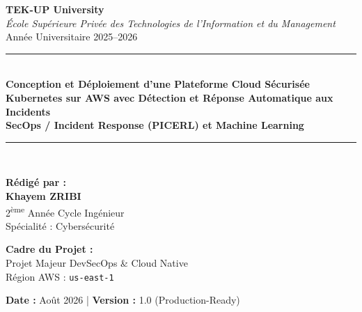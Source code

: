 \documentclass[12pt,a4paper]{report}
\begin{document}
\begin{titlepage}
    \centering
    \vspace*{0.5cm}
    {\Large\textbf{TEK-UP University}}\\[0.2cm]
    {\large\textit{École Supérieure Privée des Technologies de l'Information et du Management}}\\[0.1cm]
    {\small Année Universitaire 2025–2026}\\[1.5cm]

    \rule{\linewidth}{1.5pt}\\[0.4cm]
    {\Huge \bfseries Conception et Déploiement d'une Plateforme Cloud Sécurisée Kubernetes sur AWS avec Détection et Réponse Automatique aux Incidents}\\[0.2cm]
    {\Large \textcolor{primaryblue}{\textbf{SecOps / Incident Response (PICERL) et Machine Learning}}}\\[0.3cm]
    \rule{\linewidth}{1.5pt}\\[1.5cm]

    \begin{minipage}{0.48\textwidth}
        \begin{flushleft} \large
            \textbf{Rédigé par :}\\
            \textbf{Khayem ZRIBI}\\
            2\textsuperscript{ème} Année Cycle Ingénieur\\
            Spécialité : Cybersécurité
        \end{flushleft}
    \end{minipage}
    \hfill
    \begin{minipage}{0.48\textwidth}
        \begin{flushright} \large
            \textbf{Cadre du Projet :}\\
            Projet Majeur DevSecOps \& Cloud Native\\
            Région AWS : \texttt{us-east-1}
        \end{flushright}
    \end{minipage}

    \vfill
    {\large \textbf{Date :} Août 2026 | \textbf{Version :} 1.0 (Production-Ready)}
\end{titlepage}

\tableofcontents
\newpage

\end{document}
